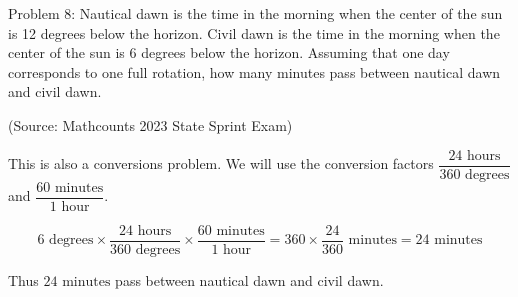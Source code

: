 Problem 8: Nautical dawn is the time in the morning when the center of the sun is 12 degrees below the horizon. Civil dawn is the time in the morning when the center of the sun is 6 degrees below the horizon. Assuming that one day corresponds to one full rotation, how many minutes pass between nautical dawn and civil dawn.

(Source: Mathcounts 2023 State Sprint Exam)

This is also a conversions problem. We will use the conversion factors $\dfrac{24 \text{ hours}}{360 \text{ degrees}}$ and $\dfrac{60 \text{ minutes}}{1 \text{ hour}}$.

$$ 6 \text{ degrees} \times \frac{24 \text{ hours}}{360 \text{ degrees}} \times \frac{60 \text{ minutes}}{1 \text{ hour}} = 360 \times \frac{24}{360} \text{ minutes} = \boxed{24 \text{ minutes}} $$

Thus $\boxed{24 \text{ minutes}}$ pass between nautical dawn and civil dawn.
